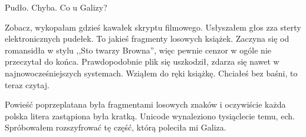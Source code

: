 Pudło. Chyba. Co u Galizy?

\begin{dialogue}
	\ds{} Zobacz, wykopałam gdzieś kawałek skryptu filmowego. \dm{} Usłyszałem głos zza sterty elektronicznych pudełek. \dm{} To jakieś fragmenty losowych książek.
	Zaczyna się od romansidła w stylu ,,Sto twarzy Browna'', więc pewnie cenzor w ogóle nie przeczytał do końca.
	\ds{} Prawdopodobnie plik się uszkodził, zdarza się nawet w najnowocześniejszych systemach. \dm{} Wziąłem do ręki książkę.
	\ds{} Chciałeś bez baśni, to teraz czytaj.
\end{dialogue}

Powieść poprzeplatana była fragmentami losowych znaków i oczywiście każda polska litera zastąpiona była kratką. 
Unicode wynaleziono tysiąclecie temu, ech.
Spróbowałem rozszyfrować tę część, którą poleciła mi Galiza.

